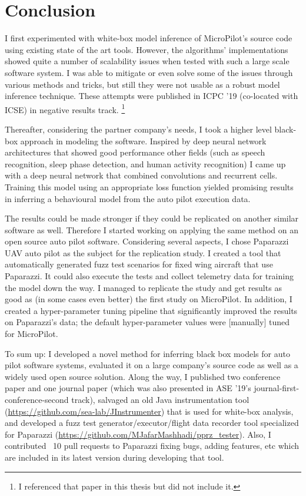 \chapter{Conclusion} %
I first experimented with white-box model inference of MicroPilot's source code using existing state of the art tools. 
However, the algorithms' implementations showed quite a number of scalability issues when tested with such a large scale software system. I was able to mitigate or even solve some of the issues through various methods and tricks, but still they were not usable as a robust model inference technique. These attempts were published in ICPC '19 (co-located with ICSE) in negative results track. \footnote{I referenced that paper \cite{mashhadi2019empirical} in this thesis but did not include it.}

Thereafter, considering the partner company's needs, I took a higher level black-box approach in modeling the software. Inspired by deep neural network architectures that showed good performance other fields (such as speech recognition, sleep phase detection, and human activity recognition) I came up with a deep neural network that combined convolutions and recurrent cells. Training this model using an appropriate loss function yielded promising results in inferring a behavioural model from the auto pilot execution data.

The results could be made stronger if they could be replicated on another similar software as well. Therefore I started working on applying the same method on an open source auto pilot software. Considering several aspects, I chose Paparazzi UAV auto pilot as the subject for the replication study. I created a tool that automatically generated fuzz test scenarios for fixed wing aircraft that use Paparazzi. It could also execute the tests and collect telemetry data for training the model down the way. 
I managed to replicate the study and get results as good as (in some cases even better) the first study on MicroPilot. In addition, I created a hyper-parameter tuning pipeline that significantly improved the results on Paparazzi's data; the default hyper-parameter values were [manually] tuned for MicroPilot.

To sum up: I developed a novel method for inferring black box models for auto pilot software systems, evaluated it on a large company's source code as well as a widely used open source solution. Along the way, I published two conference paper and one journal paper (which was also presented in ASE '19's journal-first-conference-second track), salvaged an old Java instrumentation tool (\url{https://github.com/sea-lab/JInstrumenter}) that is used for white-box analysis, and developed a fuzz test generator/executor/flight data recorder tool specialized for Paparazzi (\url{https://github.com/MJafarMashhadi/pprz_tester}). Also, I contributed ~10 pull requests to Paparazzi fixing bugs, adding features, etc which are included in its latest version during developing that tool.


